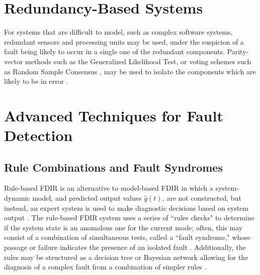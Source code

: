 




\section{Redundancy-Based Systems}

For systems that are difficult to model, such as complex software systems, redundant sensors and processing units may be used, under the suspicion of a fault being likely to occur in a single one of the redundant components. Parity-vector methods such as the Generalized Likelihood Test, or voting schemes such as Random Sample Consensus , may be used to isolate the components which are likely to be in error \cite{holsti2001towards}.

\section{Advanced Techniques for Fault Detection}

\subsection{Rule Combinations and Fault Syndromes}

Rule-based FDIR is an alternative to model-based FDIR in which a system-dynamic model, and predicted output values $\hat{y}(t)$, are not constructed, but instead, an expert system is used to make diagnostic decisions based on system output \cite{schwabacher2008pre}. The rule-based FDIR system uses a series of ``rules checks" to determine if the system state is an anomalous one for the current mode; often, this may consist of a combination of simultaneous tests, called a ``fault syndrome," whose passage or failure indicates the presence of an isolated fault \cite{hammett1991application}. Additionally, the rules may be structured as a decision tree or Bayesian network allowing for the diagnosis of a complex fault from a combination of simpler rules \cite{holsti2001towards} \cite{paakko2001bayesian}.

